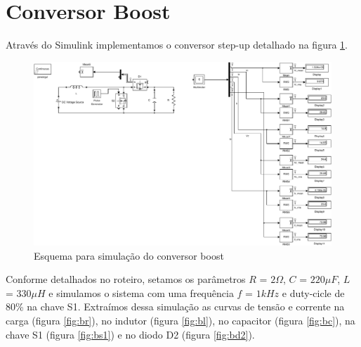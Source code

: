 \documentclass{article}
\begin{document}
\section{Conversor Boost}
Através do Simulink implementamos o conversor step-up detalhado na figura \ref{fig:bosim}.
\begin{figure}[H]
	\centering
	\includegraphics[width=\linewidth]{matlab/boost/bsim}
	\caption{Esquema para simulação do conversor boost}
	\label{fig:bosim}
\end{figure}
Conforme detalhados no roteiro, setamos os parâmetros $R$ = $2\Omega$, $C$ = $220\mu F$, $L$ = $330\mu H$ e simulamos o sistema com uma frequência $f$ = $1kHz$ e duty-cicle de 80\% na chave S1.
Extraímos dessa simulação as curvas de tensão e corrente na carga (figura \ref{fig:br}), no indutor (figura \ref{fig:bl}), no capacitor (figura \ref{fig:bc}), na chave S1 (figura \ref{fig:bs1}) e no diodo D2 (figura \ref{fig:bd2}).
\end{document}
